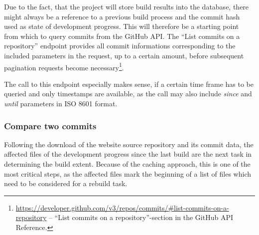 Due to the fact, that the project will store build results into the database, there might always be a reference to a previous build process and the commit hash used as state of development progress. This will therefore be a starting point from which to query commits from the GitHub API. The ``List commits on a repository'' endpoint provides all commit informations corresponding to the included parameters in the request, up to a certain amount, before subsequent pagination requests become necessary\footnote{\url{https://developer.github.com/v3/repos/commits/\#list-commits-on-a-repository} -- ``List commits on a repository''-section in the GitHub API Reference.}.

The call to this endpoint especially makes sense, if a certain time frame has to be queried and only timestamps are available, as the call may also include \emph{since} and \emph{until} parameters in ISO 8601 format.

\subsubsection{Compare two commits}
Following the download of the website source repository and its commit data, the affected files of the development progress since the last build are the next task in determining the build extent. Because of the caching approach, this is one of the most critical steps, as the affected files mark the beginning of a list of files which need to be considered for a rebuild task.
